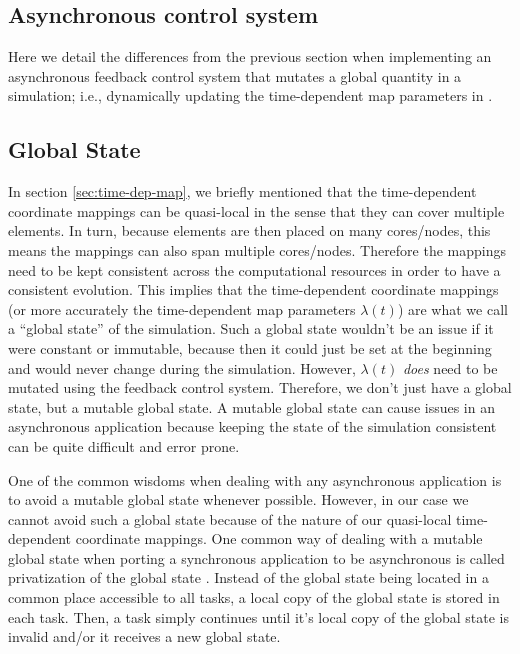 \begin{bibunit}[unsrtnat]
\section{Asynchronous control system\label{sec:async-control-system}}

Here we detail the differences from the previous section
when implementing an asynchronous feedback control
system that mutates a global quantity in a simulation; i.e., dynamically
updating the time-dependent map parameters in \spectre.

\subsection{Global State\label{sec:global-state}}

In section \ref{sec:time-dep-map}, we briefly mentioned that the time-dependent
coordinate mappings can be quasi-local in the sense that they can cover multiple
elements. In turn, because elements are then placed on many cores/nodes, this
means the mappings can also span multiple cores/nodes. Therefore the mappings
need to be kept consistent across the computational resources in order to have a
consistent evolution. This implies that the time-dependent coordinate mappings
(or more accurately the time-dependent map parameters $\lambda(t)$) are what we
call a ``global state'' of the simulation. Such a global state
wouldn't be an issue if it were constant or immutable, because then it could just
be set at the beginning and would never change during the simulation.
However, $\lambda(t)$ \textit{does} need to be mutated
using the feedback control system. Therefore, we don't just have
a global state, but a mutable global state. A mutable global state can cause
issues in an asynchronous application because keeping the state of the simulation
consistent can be quite difficult and error prone.

One of the common wisdoms when dealing with any asynchronous application is to
avoid a mutable global state whenever possible. However, in our case we cannot
avoid such a global state because of the nature of our quasi-local
time-dependent coordinate mappings. One common way of dealing with a mutable
global state when porting a synchronous application to be asynchronous is called
privatization of the global state \cite{Solihin2020-en}. Instead of the global
state being located in a common place accessible to all tasks, a local copy of
the global state is stored in each task. Then, a task simply continues until
it's local copy of the global state is invalid and/or it receives a new global
state.


\end{bibunit}
